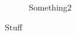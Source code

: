 \documentclass[12pt,letterpaper]{article}
\begin{document}
\begin{figure}[ht]
\begin{subfigure}{.5\textwidth}
        \caption{Something2}
        \label{fig:sub-second}
    \end{subfigure}
\caption{Stuff}
\end{figure}



\end{document}
